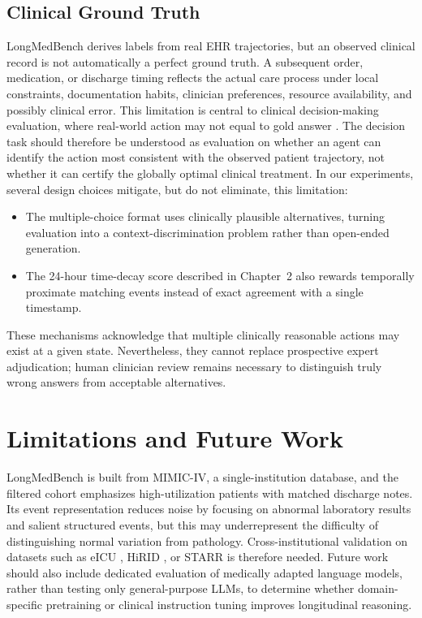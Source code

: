 \subsection{Clinical Ground Truth}
LongMedBench derives labels from real EHR trajectories, but an observed clinical record is not automatically a perfect ground truth. A subsequent order, medication, or discharge timing reflects the actual care process under local constraints, documentation habits, clinician preferences, resource availability, and possibly clinical error. This limitation is central to clinical decision-making evaluation, where real-world action may not equal to gold answer \cite{hager2024evaluation}. The decision task should therefore be understood as evaluation on whether an agent can identify the action most consistent with the observed patient trajectory, not whether it can certify the globally optimal clinical treatment. In our experiments, several design choices mitigate, but do not eliminate, this limitation:
\begin{itemize}
    \item The multiple-choice format uses clinically plausible alternatives, turning evaluation into a context-discrimination problem rather than open-ended  generation.
    \item The 24-hour time-decay score described in Chapter~2 also rewards temporally proximate matching events instead of exact agreement with a single timestamp.
\end{itemize}

These mechanisms acknowledge that multiple clinically reasonable actions may exist at a given state. Nevertheless, they cannot replace prospective expert adjudication; human clinician review remains necessary to distinguish truly wrong answers from acceptable alternatives.

\section{Limitations and Future Work}

LongMedBench is built from MIMIC-IV, a single-institution database, and the filtered cohort emphasizes high-utilization patients with matched discharge notes. Its event representation reduces noise by focusing on abnormal laboratory results and salient structured events, but this may underrepresent the difficulty of distinguishing normal variation from pathology. Cross-institutional validation on datasets such as eICU \cite{pollard2018eicu}, HiRID \cite{2021_hirid_icu}, or STARR \cite{callahan2023stanford} is therefore needed. Future work should also include dedicated evaluation of medically adapted language models, rather than testing only general-purpose LLMs, to determine whether domain-specific pretraining or clinical instruction tuning improves longitudinal reasoning. 

